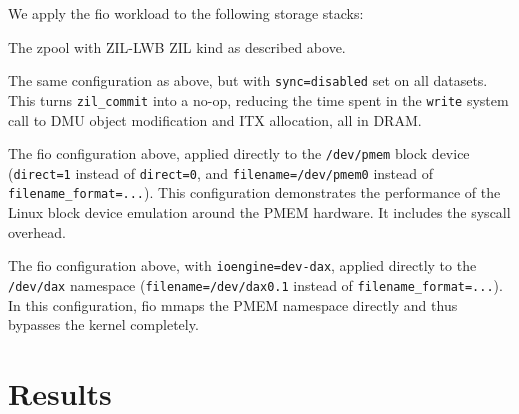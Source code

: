 \documentclass[12pt,a4paper,twoside]{book}
\begin{document}
We apply the fio workload to the following storage stacks:
\begin{description}[noitemsep,leftmargin=1.5cm,labelindent=1cm]
    \item[zil-lwb] The zpool with ZIL-LWB ZIL kind as described above.
    \item[async] The same configuration as above, but with \lstinline{sync=disabled} set on all datasets.
        This turns \lstinline{zil_commit} into a no-op, reducing the time spent in the \lstinline{write} system call to DMU object modification and ITX allocation, all in DRAM.
    \item[fsdax] The fio configuration above, applied directly to the \texttt{/dev/pmem} block device (\lstinline{direct=1} instead of \lstinline{direct=0}, and \lstinline{filename=/dev/pmem0} instead of \lstinline{filename_format=...}).
        This configuration demonstrates the performance of the Linux block device emulation around the PMEM hardware. It includes the syscall overhead.
    \item[devdax] The fio configuration above, with \lstinline{ioengine=dev-dax}, applied directly to the \texttt{/dev/dax} namespace (\lstinline{filename=/dev/dax0.1} instead of \lstinline{filename_format=...}).
        In this configuration, fio mmaps the PMEM namespace directly and thus bypasses the kernel completely.
\end{description}


\section{Results}\label{ch:lwb_analysis:results}
\end{document}
